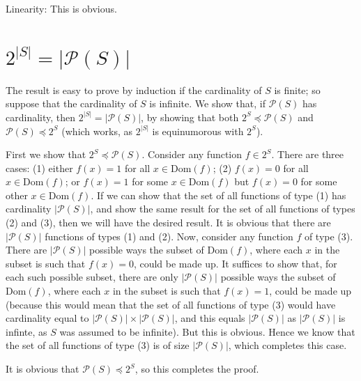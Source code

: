 \documentclass{article}
\theoremstyle{definition}
\begin{document}
Linearity: This is obvious.

\section*{$2^{|S|}=|\mathcal{P}(S)|$}
The result is easy to prove by induction if the cardinality of $S$ is finite; so suppose that the cardinality of $S$ is 
infinite. We show that, if $\mathcal{P}(S)$ has cardinality, then $2^{|S|}=|\mathcal{P}(S)|$, by showing that 
both $2^S\preceq\mathcal{P}(S)$ and $\mathcal{P}(S)\preceq 2^S$ (which works, as $2^{|S|}$ is equinumorous with $2^S$).

First we show that $2^S\preceq\mathcal{P}(S)$. 
Consider any function $f\in 2^S$. There are three cases: (1) either 
$f(x)=1$ for all $x\in\textrm{Dom}(f)$; (2) $f(x)=0$ for all $x\in\textrm{Dom}(f)$; or 
$f(x)=1$ for some $x\in\textrm{Dom}(f)$ but $f(x)=0$ for some other $x\in\textrm{Dom}(f)$. If we can show that the 
set of all functions of type (1) has cardinality $|\mathcal{P}(S)|$, and show the same result for the set of all 
functions of types (2) and (3), then we will have the desired result. It is obvious that there are 
$|\mathcal{P}(S)|$ functions of types (1) and (2). Now, consider any function $f$ of type (3). There are 
$|\mathcal{P}(S)|$ possible ways the subset of $\textrm{Dom}(f)$, where each $x$ in the subset is such that 
$f(x)=0$, could be made up. It suffices to show that, for each such possible subset, there are only 
$|\mathcal{P}(S)|$ possible ways the subset of $\textrm{Dom}(f)$, where each $x$ in the subset is such that 
$f(x)=1$, could be made up (because this would mean that the set of all functions of 
type (3) would have cardinality equal to $|\mathcal{P}(S)|\times|\mathcal{P}(S)|$, and this equals 
$|\mathcal{P}(S)|$ as $|\mathcal{P}(S)|$ is infinte, as $S$ was assumed to be infinite). But this is obvious. Hence 
we know that the set of all functions of type (3) is of size $|\mathcal{P}(S)|$, which completes this case. 

It is obvious that $\mathcal{P}(S)\preceq 2^S$, so this completes the proof.
\end{document}
